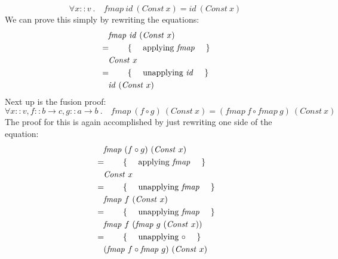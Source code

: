 \begin{displaymath}
\forall x :: \mathit{v}~. \quad \mathit{fmap}~\mathit{id}~(\mathit{Const}~x) = \mathit{id}~(\mathit{Const}~x)
\end{displaymath}
We can prove this simply by rewriting the equations:
\begin{align*}
&\quad \mathit{fmap}~\mathit{id}~(\mathit{Const}~x)\\
&=\qquad\text{\{\quad\ applying $\mathit{fmap}$ \quad\}}\\
&\quad \mathit{Const}~x\\
&=\qquad\text{\{\quad\ unapplying $\mathit{id}$ \quad\}}\\
&\quad \mathit{id}~(\mathit{Const}~x)
\end{align*}
Next up is the fusion proof:
\begin{displaymath}
\forall x :: \mathit{v}, f :: b \to c, g :: a \to b~. \quad \mathit{fmap}~(f \circ g)~(\mathit{Const}~x) = (\mathit{fmap}~f \circ \mathit{fmap}~g)~(\mathit{Const}~x)
\end{displaymath}
The proof for this is again accomplished by just rewriting one side of the equation:
\begin{align*}
&\quad \mathit{fmap}~(f \circ g)~(\mathit{Const}~x)\\
&=\qquad\text{\{\quad\ applying $\mathit{fmap}$ \quad\}}\\
&\quad \mathit{Const}~x\\
&=\qquad\text{\{\quad\ unapplying $\mathit{fmap}$ \quad\}}\\
&\quad \mathit{fmap}~f~(\mathit{Const}~x)\\
&=\qquad\text{\{\quad\ unapplying $\mathit{fmap}$ \quad\}}\\
&\quad \mathit{fmap}~f~(\mathit{fmap}~g~(\mathit{Const}~x))\\
&=\qquad\text{\{\quad\ unapplying $\circ$ \quad\}}\\
&\quad (\mathit{fmap}~f \circ \mathit{fmap}~g)~(\mathit{Const}~x)
\end{align*}

